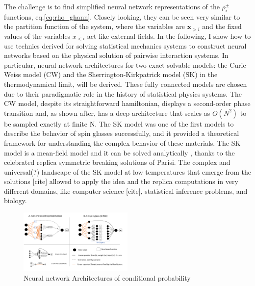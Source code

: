 \documentclass[aps,physrev,10pt,floatfix,longbibliography,nofootinbib,reprint]{revtex4-2}
\begin{document}
The challenge is to find simplified neural network representations of the $\rho_i^{\pm}$ functions, eq.\ref{eq:rho_ghann}. Closely looking, they can be seen very similar to the partition function of the system, where the variables are $\mathbf{x}_{>i}$ and the fixed values of the variables $x_{<i}$ act like external fields.
In the following, I show how to use technics derived for solving statistical mechanics systems to construct neural networks based on the physical solution of pairwise interaction systems. In particular, neural network architectures for two exact solvable models: the Curie-Weiss model (CW) and the Sherrington-Kirkpatrick model (SK) in the thermodynamical limit, will be derived. These fully connected models are chosen due to their paradigmatic role in the history of statistical physics systems. The CW model, despite its straightforward hamiltonian, displays a second-order phase transition and, as shown after, has a deep architecture that scales as $O(N^2)$ to be sampled exactly at finite N. The SK model was one of the first models to describe the behavior of spin glasses successfully, and it provided a theoretical framework for understanding the complex behavior of these materials. The SK model is a mean-field model and it can be solved analytically \cite{}, thanks to the celebrated replica symmetric breaking solutions of Parisi. The complex and universal(?) landscape of the SK model at low temperatures that emerge from the solutions [cite] allowed to apply the idea and the replica computations in very different domains, like computer science [cite], statistical inference problems, and biology. \\

\begin{figure}[!h]
    \centering 
    \includegraphics[width=0.5\textwidth]{img/ann_img.pdf}
    \caption{Neural network Architectures of conditional probability}
    \label{fig:arch_old}
\end{figure}
\end{document}
